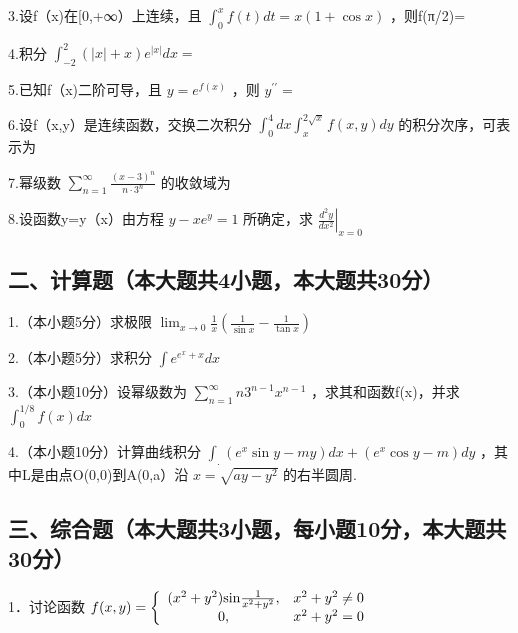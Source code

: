 \documentclass[11pt,fontset=fandol]{ctexart}
\begin{document}
3.设f（x)在{[}0,+∞）上连续，且
\(\int _ { 0 } ^ { x } f ( t ) d t = x ( 1 + \cos x )\) ，则f(π/2)=

4.积分
\(\int _ { - 2 } ^ { 2 } \left( \left| x \right| + x \right) e ^ { \left| x \right| } d x =\)

5.已知f（x)二阶可导，且 \(y = e ^ { f ( x ) }\) ，则
\(y ^ { \prime \prime } =\)

6.设f（x,y）是连续函数，交换二次积分
\(\int _ { 0 } ^ { 4 } d x \int _ { x } ^ { 2 \sqrt { x } } f ( x , y ) d y\)
的积分次序，可表示为

7.幂级数
\(\sum _ { n = 1 } ^ { \infty } { \frac { ( x - 3 ) ^ { n } } { n \cdot 3 ^ { n } } }\)
的收敛域为

8.设函数y=y（x）由方程 \(y - x e ^ { y } = 1\) 所确定，求
\(\left. { \frac { d ^ { 2 } y } { d x ^ { 2 } } } \right| _ { x = 0 }\)

\subsection{二、计算题（本大题共4小题，本大题共30分）}\label{ux4e8cux8ba1ux7b97ux9898ux672cux5927ux9898ux51714ux5c0fux9898ux672cux5927ux9898ux517130ux5206}

1.（本小题5分）求极限
\(\lim _ { x \to 0 } { \frac { 1 } { x } } { \left( { \frac { 1 } { \sin x } } - { \frac { 1 } { \tan x } } \right) }\)

2.（本小题5分）求积分 \(\int e ^ { e ^ { x } + x } d x\)

3.（本小题10分）设幂级数为
\(\sum \limits _ { n = 1 } ^ { \infty } n 3 ^ { n - 1 } x ^ { n - 1 }\)
，求其和函数f(x)，并求 \(\int _ { 0 } ^ { 1 / 8 } f ( x ) d x\)

4.（本小题10分）计算曲线积分
\(\int _ { . } ( e ^ { x } \sin y - m y ) d x + ( e ^ { x } \cos y - m ) d y\)
，其中L是由点O(0,0)到A(0,a）沿 \(x = \sqrt { a y - y ^ { 2 } }\)
的右半圆周.

\subsection{三、综合题（本大题共3小题，每小题10分，本大题共30分）}\label{ux4e09ux7efcux5408ux9898ux672cux5927ux9898ux51713ux5c0fux9898ux6bcfux5c0fux989810ux5206ux672cux5927ux9898ux517130ux5206}

1．讨论函数
\(f ( x , y ) = \left\{ \begin{array} { c c } { { ( x ^ { 2 } + y ^ { 2 } ) { \sin } \frac { 1 } { x ^ { 2 } + y ^ { 2 } } , } } & { { x ^ { 2 } + y ^ { 2 } \ne 0 } } \\ { { 0 , } } & { { x ^ { 2 } + y ^ { 2 } = 0 } } \end{array} \right.\)
\end{document}

